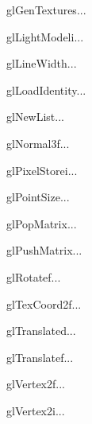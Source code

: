 \begin{funcdesc}{glGenTextures}{...}
\end{funcdesc}

\begin{funcdesc}{glLightModeli}{...}
\end{funcdesc}

\begin{funcdesc}{glLineWidth}{...}
\end{funcdesc}

\begin{funcdesc}{glLoadIdentity}{...}
\end{funcdesc}

\begin{funcdesc}{glNewList}{...}
\end{funcdesc}

\begin{funcdesc}{glNormal3f}{...}
\end{funcdesc}

\begin{funcdesc}{glPixelStorei}{...}
\end{funcdesc}

\begin{funcdesc}{glPointSize}{...}
\end{funcdesc}

\begin{funcdesc}{glPopMatrix}{...}
\end{funcdesc}

\begin{funcdesc}{glPushMatrix}{...}
\end{funcdesc}

\begin{funcdesc}{glRotatef}{...}
\end{funcdesc}

\begin{funcdesc}{glTexCoord2f}{...}
\end{funcdesc}

\begin{funcdesc}{glTranslated}{...}
\end{funcdesc}

\begin{funcdesc}{glTranslatef}{...}
\end{funcdesc}

\begin{funcdesc}{glVertex2f}{...}
\end{funcdesc}

\begin{funcdesc}{glVertex2i}{...}
\end{funcdesc}

